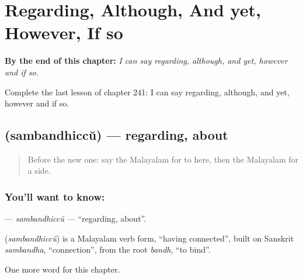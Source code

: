 
\chapter{Regarding, Although, And yet, However, If so}
\label{ch:ml-regarding-although-and-yet-however-if-so}

\begin{chapteropening}
\textbf{By the end of this chapter:} \emph{I can say regarding, although, and yet, however and if so.}

Complete the last lesson of chapter 241: I can say regarding, although, and yet, however and if so.
\end{chapteropening}

\section[\texorpdfstring{\ml{സംബന്ധിച്ച്} (sambandhiccŭ)}{സംബന്ധിച്ച് (sambandhiccŭ)}]{ (sambandhiccŭ) — regarding, about}

\label{lesson:ML-C241-sambandhiccu}



\begin{quote}
Before the new one: say the Malayalam for to here, then the Malayalam for a side.
\end{quote}

\subsection*{You'll want to know: }
\textbf{} — \emph{sambandhiccŭ} — \textquotedblleft{}regarding, about\textquotedblright{}.

\begin{cousinweb}
\textbf{} (\emph{sambandhiccŭ}) is a Malayalam verb form, \textquotedblleft{}having connected\textquotedblright{}, built on Sanskrit \emph{sambandha}, \textquotedblleft{}connection\textquotedblright{}, from the root \emph{bandh}, \textquotedblleft{}to bind\textquotedblright{}.
\end{cousinweb}

\begin{grammarlens}[title={What you've built}]
One more word for this chapter.
\end{grammarlens}

